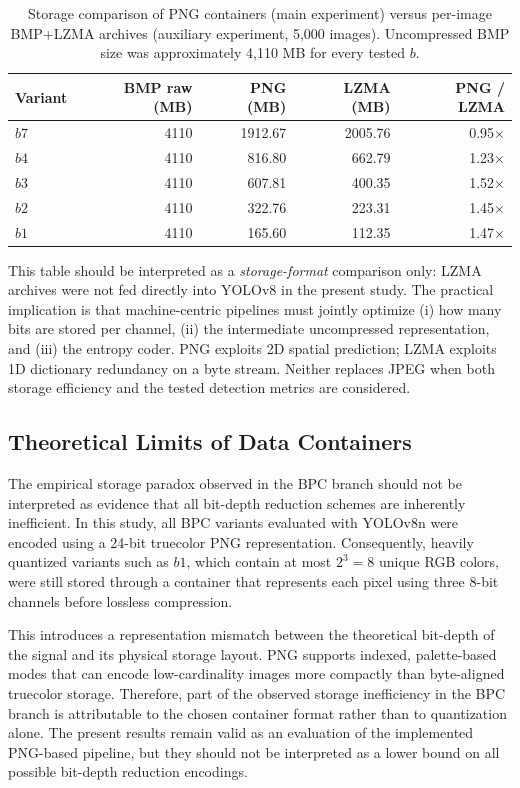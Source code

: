 \documentclass[12pt, a4paper]{article}
\begin{document}
\begin{table}[h]
\centering
\caption{Storage comparison of PNG containers (main experiment) versus per-image BMP+LZMA archives (auxiliary experiment, 5,000 images). Uncompressed BMP size was approximately 4,110 MB for every tested $b$.}
\label{tab:lzma_png_storage}
\begin{tabular}{|l|r|r|r|r|}
\hline
\textbf{Variant} & \textbf{BMP raw (MB)} & \textbf{PNG (MB)} & \textbf{LZMA (MB)} & \textbf{PNG / LZMA} \\ \hline
$b7$ & 4110 & 1912.67 & 2005.76 & 0.95$\times$ \\ \hline
$b4$ & 4110 & 816.80 & 662.79 & 1.23$\times$ \\ \hline
$b3$ & 4110 & 607.81 & 400.35 & 1.52$\times$ \\ \hline
$b2$ & 4110 & 322.76 & 223.31 & 1.45$\times$ \\ \hline
$b1$ & 4110 & 165.60 & 112.35 & 1.47$\times$ \\ \hline
\end{tabular}
\end{table}

This table should be interpreted as a \textit{storage-format} comparison only: LZMA archives were not fed directly into YOLOv8 in the present study. The practical implication is that machine-centric pipelines must jointly optimize (i) how many bits are stored per channel, (ii) the intermediate uncompressed representation, and (iii) the entropy coder. PNG exploits 2D spatial prediction; LZMA exploits 1D dictionary redundancy on a byte stream. Neither replaces JPEG when both storage efficiency and the tested detection metrics are considered.

\subsection{Theoretical Limits of Data Containers}
The empirical storage paradox observed in the BPC branch should not be interpreted as evidence that all bit-depth reduction schemes are inherently inefficient. In this study, all BPC variants evaluated with YOLOv8n were encoded using a 24-bit truecolor PNG representation. Consequently, heavily quantized variants such as $b1$, which contain at most $2^3=8$ unique RGB colors, were still stored through a container that represents each pixel using three 8-bit channels before lossless compression.

This introduces a representation mismatch between the theoretical bit-depth of the signal and its physical storage layout. PNG supports indexed, palette-based modes that can encode low-cardinality images more compactly than byte-aligned truecolor storage. Therefore, part of the observed storage inefficiency in the BPC branch is attributable to the chosen container format rather than to quantization alone. The present results remain valid as an evaluation of the implemented PNG-based pipeline, but they should not be interpreted as a lower bound on all possible bit-depth reduction encodings.
\end{document}

